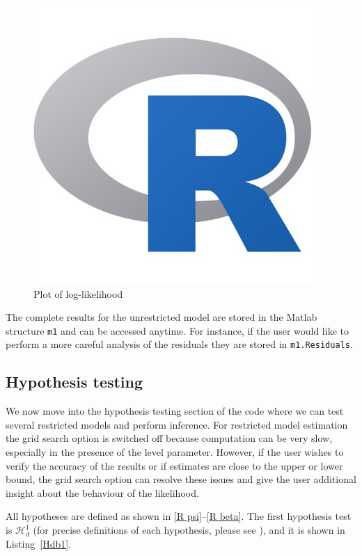 \documentclass[10pt]{article}
\begin{document}
\begin{figure}[H]
  \centering
  \caption{Plot of log-likelihood}
  \label{fig:m1_likelihood}
  \includegraphics[scale = .6, keepaspectratio=true]{m1_likelihood.png}
\end{figure}

The complete results for the unrestricted model are stored in the Matlab structure \verb|m1| and can be accessed anytime. For instance, if the user would like to perform a more careful analysis of the residuals they are stored in \verb|m1.Residuals|.

\subsection{Hypothesis testing}
\label{subsec hypo}

We now move into the hypothesis testing section of the code where we can test several restricted models and perform inference. For restricted model estimation the grid search option is switched off because computation can be very slow, especially in the presence of the level parameter. However, if the user wishes to verify the accuracy of the results or if estimates are close to the upper or lower bound, the grid search option can resolve these issues and give the user additional insight about the behaviour of the likelihood.

All hypotheses are defined as shown in \eqref{R psi}--\eqref{R beta}. The first hypothesis test is $\mathscr{H}_d^1$ (for precise definitions of each hypothesis, please see \cite{JNP2014}), and it is shown in Listing~\ref{Hdb1}. 
\end{document}
